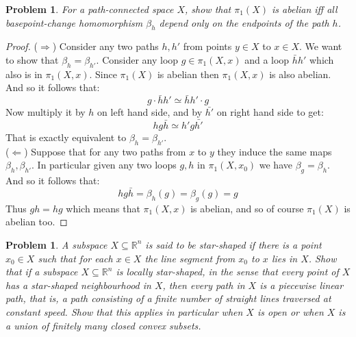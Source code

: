 \documentclass[11pt, a4paper, final]{amsart}
\numberwithin{theorem}{section}
\newtheorem{problem}[theorem]{Problem}
\theoremstyle{definition}
\theoremstyle{remark}
\begin{document}
\begin{problem}\label{problem: 1.1.3}
    For a path-connected space \(X\), show that \(\pi_1(X)\) is abelian iff all basepoint-change homomorphism \(\beta_h\) depend only on the endpoints of the path \(h\).
\end{problem}

\begin{proof}
    ($\Rightarrow$)
    Consider any two paths $h,h'$ from points $y \in X$ to $x \in X$. We want to show that $\beta_h = \beta_{h'}$. Consider any loop $g \in \pi_1(X,x)$ and a loop $\bar{h}h'$ which also is in $\pi_1(X,x)$. Since $\pi_1(X)$ is abelian then $\pi_1(X,x)$ is also abelian. And so it follows that:
    \[
        g\cdot \bar{h}h' \simeq \bar{h}h' \cdot g 
    \]
    Now multiply it by $h$ on left hand side, and by $\bar{h'}$ on right hand side to get: 
    \[
        hg\bar{h} \simeq h'g\bar{h'}
    \]
    That is exactly equivalent to $\beta_h =\beta_{h'}$. \\

    ($\Leftarrow$) Suppose that for any two paths from $x$ to $y$ they induce the same maps $\beta_h,\beta_{h'}$. In particular given any two loops $g,h$ in $\pi_1(X,x_0)$ we have $\beta_g = \beta_h$. And so it follows that:
    \[
    hg\bar{h}= \beta_h(g) =\beta_g(g)=g
    \]
    Thus $gh = hg$ which means that $\pi_1(X,x)$ is abelian, and so of course $\pi_1(X)$ is abelian too.
\end{proof}

\begin{problem}\label{problem: 1.1.4.}
    A subspace \(X \subseteq \mathbb{R}^n\) is said to be \emph{star-shaped} if there is a point \(x_0 \in X\) such that for each \(x \in X\) the line segment from \(x_0\) to \(x\) lies in \(X\). Show that if a subspace \( X \subseteq \mathbb{R}^n\) is locally star-shaped, in the sense that every point of \(X\) has a star-shaped neighbourhood in \(X\), then every path in \(X\) is a piecewise linear path, that is, a path consisting of a finite number of straight lines traversed at constant speed. Show that this applies in particular when \(X\) is open or when \(X\) is a union of finitely many closed convex subsets.
\end{problem}
\end{document}
